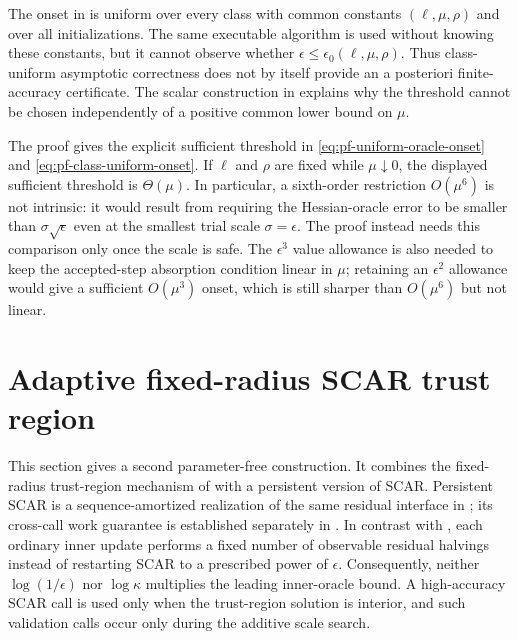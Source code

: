 \documentclass{article}
\begin{document}
\begin{remark}
The onset in  is uniform over every class with
common constants $(\ell,\mu,\rho)$ and over all initializations.  The
same executable algorithm is used without knowing these constants,
but it cannot observe whether $\epsilon\le
\epsilon_0(\ell,\mu,\rho)$.  Thus class-uniform asymptotic correctness
does not by itself provide an a posteriori finite-accuracy
certificate.
The scalar construction in
 explains why the threshold cannot be chosen
independently of a positive common lower bound on $\mu$.

The proof gives the explicit sufficient threshold in
\eqref{eq:pf-uniform-oracle-onset} and
\eqref{eq:pf-class-uniform-onset}.  If $\ell$ and $\rho$ are fixed
while $\mu\downarrow0$, the displayed sufficient threshold is
$\Theta(\mu)$.  In
particular, a sixth-order restriction $O(\mu^6)$ is not intrinsic: it
would result from requiring the Hessian-oracle error to be smaller
than $\sigma\sqrt\epsilon$ even at the smallest trial scale
$\sigma=\epsilon$.  The proof instead needs this comparison only once
the scale is safe.  The $\epsilon^3$ value allowance is also needed
to keep the accepted-step absorption condition linear in $\mu$;
retaining an $\epsilon^2$ allowance would give a sufficient
$O(\mu^3)$ onset, which is still sharper than $O(\mu^6)$ but not
linear.
\end{remark}

\section{Adaptive fixed-radius SCAR trust region}
\label{sec:pf-fixed-radius}

This section gives a second parameter-free construction.  It combines
the fixed-radius trust-region mechanism of
\citet[Section~8.7]{luenberger2021linear} with a persistent version of
SCAR.  Persistent SCAR is a sequence-amortized realization of the same
residual interface in ; its cross-call
work guarantee is established separately in
.  In contrast with
, each ordinary inner update performs a fixed
number of observable residual halvings instead of restarting SCAR to a
prescribed power of $\epsilon$.  Consequently, neither
$\log(1/\epsilon)$ nor $\log\kappa$ multiplies the leading inner-oracle
bound.  A high-accuracy SCAR call is used only when the trust-region
solution is interior, and such validation calls occur only during the
additive scale search.
\end{document}
